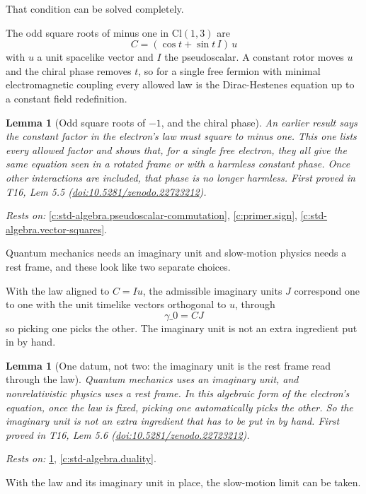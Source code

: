 \documentclass[11pt]{article}
\newtheorem{lemma}[theorem]{Lemma}
\theoremstyle{definition}
\theoremstyle{plain}
\providecommand{\Cl}{}\renewcommand{\Cl}{\mathrm{Cl}}
\begin{document}
That condition can be solved completely.

The odd square roots of minus one in $\Cl(1,3)$ are \[ C = (\cos t + \sin t\, I)\,u \] with $u$ a unit spacelike vector and $I$ the pseudoscalar. A constant rotor moves $u$ and the chiral phase removes $t$, so for a single free fermion with minimal electromagnetic coupling every allowed law is the Dirac-Hestenes equation up to a constant field redefinition.

\begin{lemma}[Odd square roots of $-1$, and the chiral phase]\label{c:one-relation.odd-square-roots-chiral-phase}
An earlier result says the constant factor in the electron's law must square to minus one. This one lists every allowed factor and shows that, for a single free electron, they all give the same equation seen in a rotated frame or with a harmless constant phase. Once other interactions are included, that phase is no longer harmless.
\emph{First proved in} T16, Lem 5.5 (\href{https://doi.org/10.5281/zenodo.22723212}{doi:10.5281/zenodo.22723212}).
\end{lemma}
\noindent\emph{Rests on:} \ref{c:std-algebra.pseudoscalar-commutation}, \ref{c:primer.sign}, \ref{c:std-algebra.vector-squares}.

Quantum mechanics needs an imaginary unit and slow-motion physics needs a rest frame, and these look like two separate choices.

With the law aligned to $C = Iu$, the admissible imaginary units $J$ correspond one to one with the unit timelike vectors orthogonal to $u$, through \[ \gamma\_{0} = CJ \] so picking one picks the other. The imaginary unit is not an extra ingredient put in by hand.

\begin{lemma}[One datum, not two: the imaginary unit is the rest frame read through the law]\label{c:one-relation.one-datum-not-two-imaginary-unit}
Quantum mechanics uses an imaginary unit, and nonrelativistic physics uses a rest frame. In this algebraic form of the electron's equation, once the law is fixed, picking one automatically picks the other. So the imaginary unit is not an extra ingredient that has to be put in by hand.
\emph{First proved in} T16, Lem 5.6 (\href{https://doi.org/10.5281/zenodo.22723212}{doi:10.5281/zenodo.22723212}).
\end{lemma}
\noindent\emph{Rests on:} \ref{c:one-relation.odd-square-roots-chiral-phase}, \ref{c:std-algebra.duality}.

With the law and its imaginary unit in place, the slow-motion limit can be taken.
\end{document}

